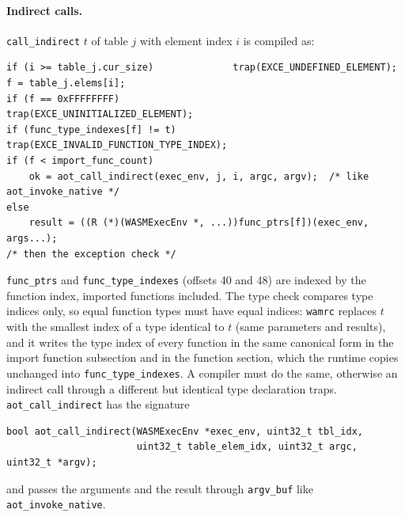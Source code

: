 \documentclass{article}
\begin{document}
\paragraph{Indirect calls.}
\verb|call_indirect| $t$ of table $j$ with element index $i$ is compiled as:
\begin{verbatim}
if (i >= table_j.cur_size)              trap(EXCE_UNDEFINED_ELEMENT);
f = table_j.elems[i];
if (f == 0xFFFFFFFF)                    trap(EXCE_UNINITIALIZED_ELEMENT);
if (func_type_indexes[f] != t)          trap(EXCE_INVALID_FUNCTION_TYPE_INDEX);
if (f < import_func_count)
    ok = aot_call_indirect(exec_env, j, i, argc, argv);  /* like aot_invoke_native */
else
    result = ((R (*)(WASMExecEnv *, ...))func_ptrs[f])(exec_env, args...);
/* then the exception check */
\end{verbatim}
\verb|func_ptrs| and \verb|func_type_indexes| (offsets 40 and 48) are indexed by the function index, imported functions included.
The type check compares type indices only, so equal function types must have equal indices: \texttt{wamrc} replaces $t$ with the smallest index of a type identical to $t$ (same parameters and results), and it writes the type index of every function in the same canonical form in the import function subsection and in the function section, which the runtime copies unchanged into \verb|func_type_indexes|.
A compiler must do the same, otherwise an indirect call through a different but identical type declaration traps.
\verb|aot_call_indirect| has the signature
\begin{verbatim}
bool aot_call_indirect(WASMExecEnv *exec_env, uint32_t tbl_idx,
                       uint32_t table_elem_idx, uint32_t argc, uint32_t *argv);
\end{verbatim}
and passes the arguments and the result through \verb|argv_buf| like \verb|aot_invoke_native|.
\end{document}
